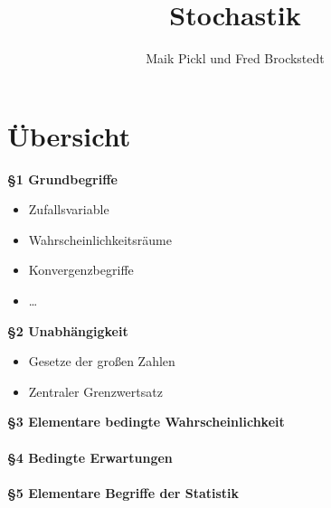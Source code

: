 \documentclass[10pt,a4paper]{report}
\author{Maik Pickl und Fred Brockstedt}
\title{Stochastik}
\numberwithin{equation}{section}
\numberwithin{figure}{section}
\theoremstyle{plain}
\theoremstyle{definition}
\theoremstyle{plain}
\theoremstyle{definition}
\theoremstyle{remark}
\theoremstyle{plain}
\begin{document}
\chapter*{Übersicht}
\textbf{\S 1 \qquad Grundbegriffe}
\begin{itemize}
\item Zufallsvariable
\item Wahrscheinlichkeitsräume
\item Konvergenzbegriffe
\item \dots
\end{itemize}
\textbf{\S 2 \qquad Unabhängigkeit}
\begin{itemize}
\item Gesetze der großen Zahlen
\item Zentraler Grenzwertsatz
\end{itemize}
\textbf{\S 3 \qquad Elementare bedingte Wahrscheinlichkeit}\\\\
\textbf{\S 4 \qquad Bedingte Erwartungen}\\\\
\textbf{\S 5 \qquad Elementare Begriffe der Statistik}\\\\
\end{document}
